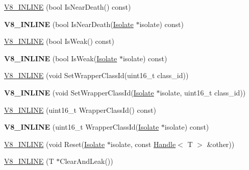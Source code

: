 \begin{DoxyCompactItemize}
\item 
\hyperlink{classv8_1_1_persistent_a480643005f3ce865ea6084a9249dbf6f}{V8\+\_\+\+I\+N\+L\+I\+N\+E} (bool Is\+Near\+Death() const)
\item 
\hypertarget{classv8_1_1_persistent_af76521b3119940e7200fd12ea6aac533}{}{\bfseries V8\+\_\+\+I\+N\+L\+I\+N\+E} (bool Is\+Near\+Death(\hyperlink{classv8_1_1_isolate}{Isolate} $\ast$isolate) const)\label{classv8_1_1_persistent_af76521b3119940e7200fd12ea6aac533}

\item 
\hyperlink{classv8_1_1_persistent_ab3ecacdf4c67a295d57658e348153b6c}{V8\+\_\+\+I\+N\+L\+I\+N\+E} (bool Is\+Weak() const)
\item 
\hypertarget{classv8_1_1_persistent_acfa08355e94e227b6319123d40cd8710}{}{\bfseries V8\+\_\+\+I\+N\+L\+I\+N\+E} (bool Is\+Weak(\hyperlink{classv8_1_1_isolate}{Isolate} $\ast$isolate) const)\label{classv8_1_1_persistent_acfa08355e94e227b6319123d40cd8710}

\item 
\hyperlink{classv8_1_1_persistent_a57a08d23ba324fee6b86e4df808e1d6d}{V8\+\_\+\+I\+N\+L\+I\+N\+E} (void Set\+Wrapper\+Class\+Id(uint16\+\_\+t class\+\_\+id))
\item 
\hypertarget{classv8_1_1_persistent_a929e7d86fc54c414931805e01e3af9e4}{}{\bfseries V8\+\_\+\+I\+N\+L\+I\+N\+E} (void Set\+Wrapper\+Class\+Id(\hyperlink{classv8_1_1_isolate}{Isolate} $\ast$isolate, uint16\+\_\+t class\+\_\+id))\label{classv8_1_1_persistent_a929e7d86fc54c414931805e01e3af9e4}

\item 
\hyperlink{classv8_1_1_persistent_aea12008dfeca52acd8e687187c25e4b7}{V8\+\_\+\+I\+N\+L\+I\+N\+E} (uint16\+\_\+t Wrapper\+Class\+Id() const)
\item 
\hypertarget{classv8_1_1_persistent_a212b9d40b2152e00fe9e7e028c296fea}{}{\bfseries V8\+\_\+\+I\+N\+L\+I\+N\+E} (uint16\+\_\+t Wrapper\+Class\+Id(\hyperlink{classv8_1_1_isolate}{Isolate} $\ast$isolate) const)\label{classv8_1_1_persistent_a212b9d40b2152e00fe9e7e028c296fea}

\item 
\hyperlink{classv8_1_1_persistent_a55b4861576f082c14bb86af2bc3b88bf}{V8\+\_\+\+I\+N\+L\+I\+N\+E} (void Reset(\hyperlink{classv8_1_1_isolate}{Isolate} $\ast$isolate, const \hyperlink{classv8_1_1_handle}{Handle}$<$ T $>$ \&other))
\item 
\hyperlink{classv8_1_1_persistent_a14f3ade66f923281840a82d62037cccd}{V8\+\_\+\+I\+N\+L\+I\+N\+E} (T $\ast$Clear\+And\+Leak())
\end{DoxyCompactItemize}
